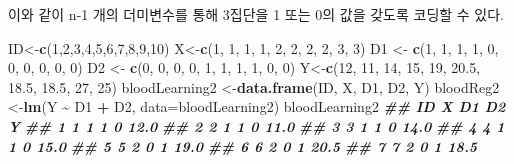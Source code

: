 \documentclass[
]{book}
\newenvironment{Shaded}{\begin{snugshade}}{\end{snugshade}}
\newcommand{\AttributeTok}[1]{\textcolor[rgb]{0.13,0.29,0.53}{#1}}
\newcommand{\DecValTok}[1]{\textcolor[rgb]{0.00,0.00,0.81}{#1}}
\newcommand{\DocumentationTok}[1]{\textcolor[rgb]{0.56,0.35,0.01}{\textbf{\textit{#1}}}}
\newcommand{\FloatTok}[1]{\textcolor[rgb]{0.00,0.00,0.81}{#1}}
\newcommand{\FunctionTok}[1]{\textcolor[rgb]{0.13,0.29,0.53}{\textbf{#1}}}
\newcommand{\NormalTok}[1]{#1}
\newcommand{\OtherTok}[1]{\textcolor[rgb]{0.56,0.35,0.01}{#1}}
\newcommand{\SpecialCharTok}[1]{\textcolor[rgb]{0.81,0.36,0.00}{\textbf{#1}}}
\begin{document}
이와 같이 n-1 개의 더미변수를 통해 3집단을 1 또는 0의 값을 갖도록 코딩할 수 있다.

\begin{Shaded}
\begin{Highlighting}[]
\NormalTok{ID}\OtherTok{\textless{}{-}}\FunctionTok{c}\NormalTok{(}\DecValTok{1}\NormalTok{,}\DecValTok{2}\NormalTok{,}\DecValTok{3}\NormalTok{,}\DecValTok{4}\NormalTok{,}\DecValTok{5}\NormalTok{,}\DecValTok{6}\NormalTok{,}\DecValTok{7}\NormalTok{,}\DecValTok{8}\NormalTok{,}\DecValTok{9}\NormalTok{,}\DecValTok{10}\NormalTok{) }
\NormalTok{X}\OtherTok{\textless{}{-}}\FunctionTok{c}\NormalTok{(}\DecValTok{1}\NormalTok{, }\DecValTok{1}\NormalTok{, }\DecValTok{1}\NormalTok{, }\DecValTok{1}\NormalTok{, }\DecValTok{2}\NormalTok{, }\DecValTok{2}\NormalTok{, }\DecValTok{2}\NormalTok{, }\DecValTok{2}\NormalTok{, }\DecValTok{3}\NormalTok{, }\DecValTok{3}\NormalTok{)}
\NormalTok{D1 }\OtherTok{\textless{}{-}} \FunctionTok{c}\NormalTok{(}\DecValTok{1}\NormalTok{, }\DecValTok{1}\NormalTok{, }\DecValTok{1}\NormalTok{, }\DecValTok{1}\NormalTok{, }\DecValTok{0}\NormalTok{, }\DecValTok{0}\NormalTok{, }\DecValTok{0}\NormalTok{, }\DecValTok{0}\NormalTok{, }\DecValTok{0}\NormalTok{, }\DecValTok{0}\NormalTok{)}
\NormalTok{D2 }\OtherTok{\textless{}{-}} \FunctionTok{c}\NormalTok{(}\DecValTok{0}\NormalTok{, }\DecValTok{0}\NormalTok{, }\DecValTok{0}\NormalTok{, }\DecValTok{0}\NormalTok{, }\DecValTok{1}\NormalTok{, }\DecValTok{1}\NormalTok{, }\DecValTok{1}\NormalTok{, }\DecValTok{1}\NormalTok{, }\DecValTok{0}\NormalTok{, }\DecValTok{0}\NormalTok{)}
\NormalTok{Y}\OtherTok{\textless{}{-}}\FunctionTok{c}\NormalTok{(}\DecValTok{12}\NormalTok{, }\DecValTok{11}\NormalTok{, }\DecValTok{14}\NormalTok{, }\DecValTok{15}\NormalTok{, }\DecValTok{19}\NormalTok{, }\FloatTok{20.5}\NormalTok{, }\FloatTok{18.5}\NormalTok{, }\FloatTok{18.5}\NormalTok{, }\DecValTok{27}\NormalTok{, }\DecValTok{25}\NormalTok{)}
\NormalTok{bloodLearning2 }\OtherTok{\textless{}{-}}\FunctionTok{data.frame}\NormalTok{(ID, X, D1, D2, Y)}
\NormalTok{bloodReg2 }\OtherTok{\textless{}{-}}\FunctionTok{lm}\NormalTok{(Y }\SpecialCharTok{\textasciitilde{}}\NormalTok{ D1 }\SpecialCharTok{+}\NormalTok{ D2, }\AttributeTok{data=}\NormalTok{bloodLearning2)}
\NormalTok{bloodLearning2}
\DocumentationTok{\#\#    ID X D1 D2    Y}
\DocumentationTok{\#\# 1   1 1  1  0 12.0}
\DocumentationTok{\#\# 2   2 1  1  0 11.0}
\DocumentationTok{\#\# 3   3 1  1  0 14.0}
\DocumentationTok{\#\# 4   4 1  1  0 15.0}
\DocumentationTok{\#\# 5   5 2  0  1 19.0}
\DocumentationTok{\#\# 6   6 2  0  1 20.5}
\DocumentationTok{\#\# 7   7 2  0  1 18.5}

\end{Highlighting}
\end{Shaded}
\end{document}
